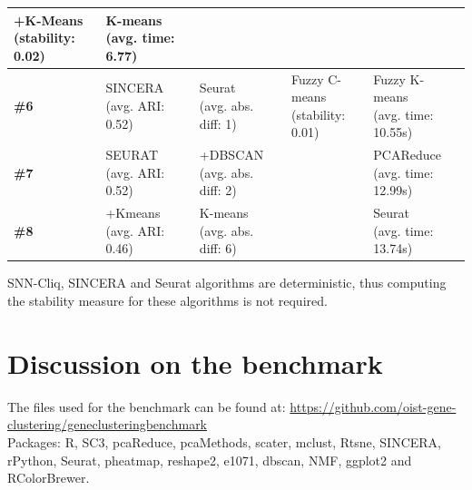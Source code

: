 \documentclass{report}
\begin{document}
\begin{table}[H]
\begin{tabular}{| l | l | l | l | l |}
\parbox[c]{3cm}{+K-Means\\(stability: 0.02)} &
\parbox[c]{3cm}{K-means\\(avg. time: 6.77)}\\
\hline
\parbox[c]{2cm}{\textbf{\#6}} & 
\parbox[c]{3cm}{SINCERA\\(avg. ARI: 0.52)} & 
\parbox[c]{3cm}{Seurat\\(avg. abs. diff: 1)} & 
\parbox[c]{3cm}{Fuzzy C-means\\(stability: 0.01)} &
\parbox[c]{3cm}{Fuzzy K-means\\(avg. time: 10.55s)}\\
\hline
\parbox[c]{2cm}{\textbf{\#7}} & 
\parbox[c]{3cm}{SEURAT\\(avg. ARI: 0.52)} & 
\parbox[c]{3cm}{+DBSCAN\\(avg. abs. diff: 2)} & 
\parbox[c]{3cm}{} &
\parbox[c]{3cm}{PCAReduce\\(avg. time: 12.99s)}\\
\hline
\parbox[c]{2cm}{\textbf{\#8}} & 
\parbox[c]{3cm}{+Kmeans\\(avg. ARI: 0.46)} & 
\parbox[c]{3cm}{K-means\\(avg. abs. diff: 6)} & 
\parbox[c]{3cm}{} &
\parbox[c]{3cm}{Seurat\\(avg. time: 13.74s)}\\
\hline
\end{tabular}
\label{results}
\end{table}

SNN-Cliq, SINCERA and Seurat algorithms are deterministic, thus computing the stability measure for these algorithms is not required.

\section{Discussion on the benchmark}

The files used for the benchmark can be found at: {\url{https://github.com/oist-gene-clustering/geneclusteringbenchmark}}\\

Packages: R\cite{baser}, SC3\cite{sc3r}, pcaReduce\cite{pcareducer}, pcaMethods\cite{pcamethodsr}, scater\cite{scaterr}, mclust\cite{mclustr}, Rtsne\cite{rtsner}, SINCERA\cite{sincerar}, rPython\cite{rpythonr}, Seurat\cite{seuratr}, pheatmap\cite{pheatmapr}, reshape2\cite{reshape2r}, e1071\cite{e1071r}, dbscan\cite{dbscanr}, NMF\cite{nmfr}, ggplot2\cite{ggplot2r} and RColorBrewer\cite{rcolorbrewerr}.\\
\end{document}
